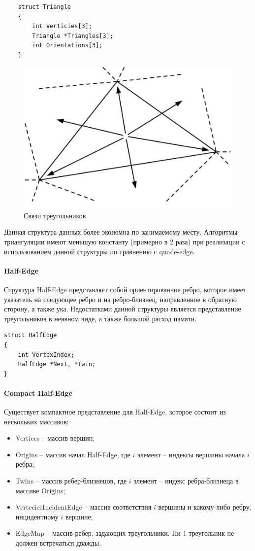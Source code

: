 \documentclass{fefu}
\begin{document}
\begin{verbatim}
    struct Triangle 
    {
        int Verticies[3];
        Triangle *Triangles[3];
        int Orientations[3];
    }
\end{verbatim}
\begin{figure}
    \centering
    \includegraphics{images/TriangleStructure.png}
    \caption{Связи треугольников}
\end{figure}

Данная структура данных более экономна по занимаемому месту. Алгоритмы триангуляции имеют меньшую константу (примерно в 
2 раза) при реализации с использованием данной структуры по сравнению с quade-edge.
\paragraph{Half-Edge}
Структура Half-Edge представляет собой ориентированное ребро, которое имеет указатель на следующее ребро и на 
ребро-близнец, направленное в обратную сторону, а также ука. Недостатками данной структуры является представление 
треугольников в неявном виде, а также большой расход памяти.
\begin{verbatim}
struct HalfEdge 
{
    int VertexIndex;
    HalfEdge *Next, *Twin;
}

\end{verbatim}
\paragraph{Compact Half-Edge}

Существует компактное представление для Half-Edge\cite{CHE}, которое состоит из нескольких массивов:
\begin{itemize}
    \item Vertices -- массив вершин;
    \item Origins -- массив начал Half-Edge, где $i$ элемент -- индексы вершины начала $i$ ребра; 
    \item Twins -- массив ребер-близнецов, где $i$ элемент -- индекс ребра-близнеца в массиве Origins;
    \item VerteciesIncidentEdge -- массив соответствия $i$ вершины и какому-либо ребру, инцидентному $i$ вершине;
    \item EdgeMap -- массив ребер, задающих треугольники. Ни 1 треугольник не должен встречаться дважды.
\end{itemize}
\end{document}
